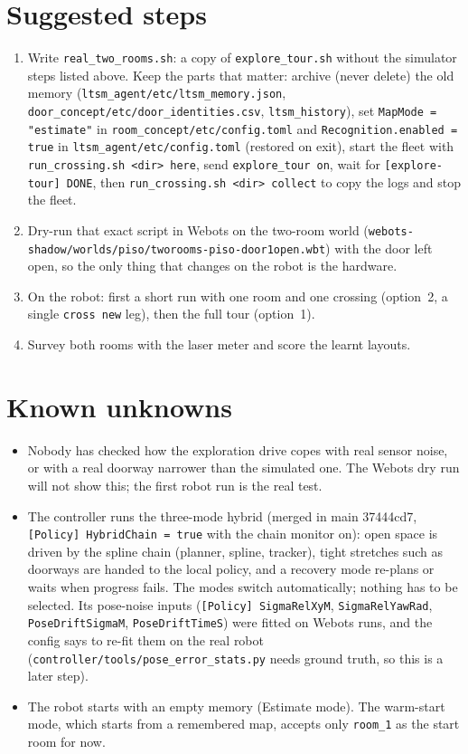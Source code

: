 \documentclass[11pt,a4paper]{article}
\newcommand{\f}[1]{\texttt{#1}}
\begin{document}
\section{Suggested steps}
\begin{enumerate}
\item Write \f{real\_\allowbreak{}two\_\allowbreak{}rooms.sh}: a copy of \f{explore\_\allowbreak{}tour.sh} without the simulator steps listed above. Keep the
  parts that matter: archive (never delete) the old memory (\f{ltsm\_\allowbreak{}agent/\allowbreak{}etc/\allowbreak{}ltsm\_\allowbreak{}memory.json},
  \f{door\_\allowbreak{}concept/\allowbreak{}etc/\allowbreak{}door\_\allowbreak{}identities.csv}, \f{ltsm\_\allowbreak{}history}), set \f{MapMode = "estimate"} in
  \f{room\_\allowbreak{}concept/\allowbreak{}etc/\allowbreak{}config.toml} and \f{Recognition.enabled = true} in \f{ltsm\_\allowbreak{}agent/\allowbreak{}etc/\allowbreak{}config.toml} (restored on
  exit), start the fleet with \f{run\_\allowbreak{}crossing.sh <dir> here}, send \f{explore\_\allowbreak{}tour on}, wait for
  \f{[explore-tour] DONE}, then \f{run\_\allowbreak{}crossing.sh <dir> collect} to copy the logs and stop the fleet.
\item Dry-run that exact script in Webots on the two-room world (\f{webots-shadow/\allowbreak{}worlds/\allowbreak{}piso/\allowbreak{}tworooms-piso-door1open.wbt}) with the door left
  open, so the only thing that changes on the robot is the hardware.
\item On the robot: first a short run with one room and one crossing (option~2, a single \f{cross new} leg), then the
  full tour (option~1).
\item Survey both rooms with the laser meter and score the learnt layouts.
\end{enumerate}

\section{Known unknowns}
\begin{itemize}
\item Nobody has checked how the exploration drive copes with real sensor noise, or with a real doorway narrower than
  the simulated one. The Webots dry run will not show this; the first robot run is the real test.
\item The controller runs the three-mode hybrid (merged in main 37444cd7, \f{[Policy] HybridChain = true} with the
  chain monitor on): open space is driven by the spline chain (planner, spline, tracker), tight stretches such as doorways
  are handed to the local policy, and a recovery mode re-plans or waits when progress fails. The modes switch automatically;
  nothing has to be selected. Its pose-noise inputs (\f{[Policy] SigmaRelXyM}, \f{SigmaRelYawRad}, \f{PoseDriftSigmaM},
  \f{PoseDriftTimeS}) were fitted on Webots runs, and the config says to re-fit them on the real robot
  (\f{controller/tools/pose\_error\_stats.py} needs ground truth, so this is a later step).
\item The robot starts with an empty memory (Estimate mode). The warm-start mode, which starts from a remembered map,
  accepts only \f{room\_\allowbreak{}1} as the start room for now.
\end{itemize}
\end{document}
